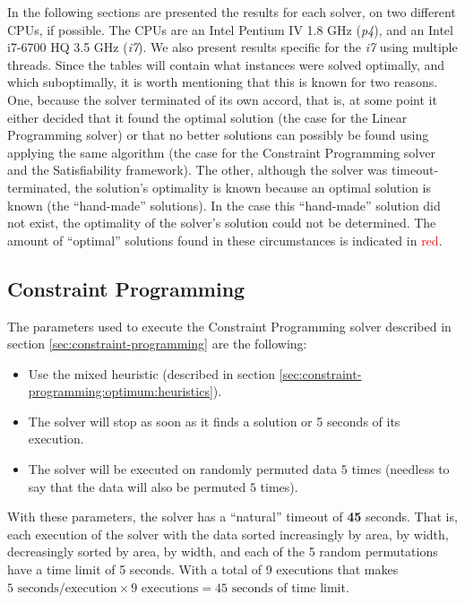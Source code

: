 In the following sections are presented the results for each solver,
on two different CPUs, if possible. The CPUs are an Intel Pentium IV 1.8 GHz
(\textit{p4}), and an Intel i7-6700 HQ 3.5 GHz (\textit{i7}). We also present
results specific for the \textit{i7} using multiple threads. Since the tables
will contain what instances were solved optimally, and which suboptimally, 
it is worth mentioning that this is known for two reasons. One, because the solver
terminated of its own accord, that is, at some point it either decided that
it found the optimal solution (the case for the Linear Programming solver) or
that no better solutions can possibly be found using applying the same algorithm
(the case for the Constraint Programming solver and the Satisfiability framework).
The other, although the solver was timeout-terminated, the solution's optimality
is known because an optimal solution is known (the ``hand-made'' solutions). In
the case this ``hand-made'' solution did not exist, the optimality of the solver's
solution could not be determined. The amount of ``optimal'' solutions found in these
circumstances is indicated in \textcolor{red}{red}.

\subsection{Constraint Programming}
\label{sec:benchmarking:constraint-programming}

The parameters used to execute the Constraint Programming solver described in section
\ref{sec:constraint-programming} are the following:
\begin{itemize}
	\item Use the mixed heuristic (described in section \ref{sec:constraint-programming:optimum:heuristics}).
	\item The solver will stop as soon as it finds a solution or 5 seconds of its execution.
	\item The solver will be executed on randomly permuted data $5$ times (needless to
	say that the data will also be permuted $5$ times).
\end{itemize}

With these parameters, the solver has a ``natural'' timeout of \textbf{45} seconds.
That is, each execution of the solver with the data sorted increasingly by area, by
width, decreasingly sorted by area, by width, and each of the 5 random permutations
have a time limit of 5 seconds. With a total of 9 executions that makes
$5 \text{ seconds/execution} \times 9 \text{ executions} = 45 \text{ seconds}$ of time limit.

